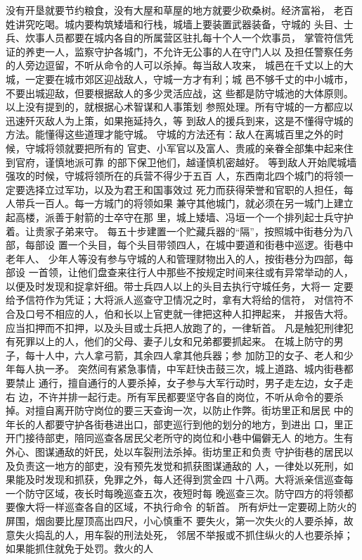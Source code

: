 \documentclass[12pt,UTF8]{ctexbook}
\begin{document}
没有开垦就要节约粮食，没有大屋和草屋的地方就要少砍桑树。经济富裕， 
老百姓讲究吃喝。城内要构筑矮墙和行栈，城墙上要装置武器装备，守城的 
头目、士兵、炊事人员都要在城内各自的所属营区驻扎每十个人一个炊事员， 
掌管符信凭证的养吏一人，监察守护各城门，不允许无公事的人在守门人以 
及担任警察任务的人旁边逗留，不听从命令的人可以杀掉。每当敌人攻来， 
城邑在千丈以上的大城，一定要在城市郊区迎战敌人，守城一方才有利；城 
邑不够千丈的中小城市，不要出城迎敌，但要根据敌人的多少灵活应战，这 
些都是防守城池的大体原则。以上没有提到的，就根据心术智谋和人事策划 
参照处理。所有守城的一方都应以迅速歼灭敌人为上策，如果拖延持久，等 
到敌人的援兵到来，这是不懂得守城的方法。能懂得这些道理才能守城。 
守城的方法还有：敌人在离城百里之外的时候，守城将领就要把所有的 
官吏、小军官以及富人、贵戚的亲眷全部集中起来住到官府，谨慎地派可靠 
的部下保卫他们，越谨慎机密越好。 
等到敌人开始爬城墙强攻的时候，守城将领所在的兵营不得少于五百 
人，东西南北四个城门的将领一定要选择立过军功，以及为君王和国事效过 
死力而获得荣誉和官职的人担任，每人带兵一百人。每一方城门的将领如果 
兼守其他城门，就必须在另一城门上建立起高楼，派善于射箭的士卒守在那 
里，城上矮墙、冯垣一个一个排列起士兵守护着。让贵家子弟来守。 
每五十步建置一个贮藏兵器的“隔”，按照城中街巷分为八部，每部设 
置一个头目，每个头目带领四人，在城中要道和街巷中巡逻。街巷中老年人、 
少年人等没有参与守城的人和管理财物出入的人，按街巷分为四部，每部设 
一首领，让他们盘查来往行人中那些不按规定时间来往或有异常举动的人， 
以便及时发现和捉拿奸细。带士兵四人以上的头目去执行守城任务，大将一 
定要给予信符作为凭证；大将派人巡查守卫情况之时，拿有大将给的信符， 
对信符不合及口号不相应的人，伯和长以上官吏就一律把这种人扣押起来， 
并报告大将。应当扣押而不扣押，以及头目或士兵把人放跑了的，一律斩首。 
凡是触犯刑律犯有死罪以上的人，他们的父母、妻子儿女和兄弟都要抓起来。 
在城上防守的男子，每十人中，六人拿弓箭，其余四人拿其他兵器；参 
加防卫的女子、老人和少年每人执一矛。 
突然间有紧急事情，中军赶快击鼓三次，城上道路、城内街巷都要禁止 
通行，擅自通行的人要杀掉，女子参与大军行动时，男子走左边，女子走右 
边，不许并排一起行走。所有军民都要坚守各自的岗位，不听从命令的要杀 
掉。对擅自离开防守岗位的要三天查询一次，以防止作弊。街坊里正和居民 
中的年长的人都要守护各街巷进出口，部吏巡行到他的划分的地方，到进出 
口，里正开门接待部吏，陪同巡查各居民父老所守的岗位和小巷中偏僻无人 
的地方。生有外心、图谋通敌的奸民，处以车裂刑法杀掉。街坊里正和负责 
守护街巷的居民以及负责这一地方的部吏，没有预先发觉和抓获图谋通敌的 
人，一律处以死刑，如果能及时发现和抓获，免罪之外，每人还得到赏金四 
十八两。大将派亲信巡查每一个防守区域，夜长时每晚巡查五次，夜短时每 
晚巡查三次。防守四方的将领都要像大将一样巡查各自的区域，不执行命令 
的斩首。 
所有炉灶一定要砌上防火的屏围，烟囱要比屋顶高出四尺，小心慎重不 
要失火，第一次失火的人要杀掉，故意失火捣乱的人，用车裂的刑法处死， 
邻居不举报或不抓住纵火的人也要杀掉；如果能抓住就免于处罚。救火的人 
\end{document}
